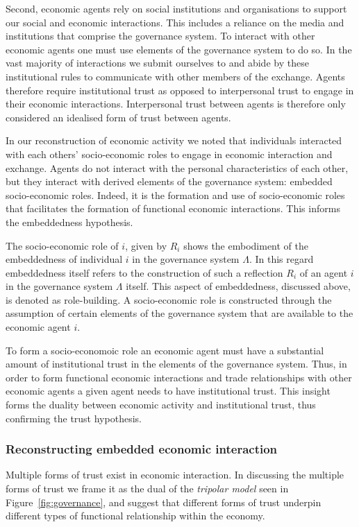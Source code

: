 \begin{subappendices}
Second, economic agents rely on social institutions and organisations to support our social and economic interactions. This includes a reliance on the media and institutions that comprise the governance system. To interact with other economic agents one must use elements of the governance system to do so. In the vast majority of interactions we submit ourselves to and abide by these institutional rules to communicate with other members of the exchange. Agents therefore require institutional trust as opposed to interpersonal trust to engage in their economic interactions. Interpersonal trust between agents is therefore only considered an idealised form of trust between agents.

\medskip\noindent In our reconstruction of economic activity we noted that individuals interacted with each others' socio-economic roles to engage in economic interaction and exchange. Agents do not interact with the personal characteristics of each other, but they interact with derived elements of the governance system: embedded socio-economic roles. Indeed, it is the formation and use of socio-economic roles that facilitates the formation of functional economic interactions. This informs the embeddedness hypothesis.

The socio-economic role of $i$, given by $R_{i}$ shows the embodiment of the embeddedness of individual $i$ in the governance system $\Lambda$. In this regard embeddedness itself refers to the construction of such a reflection $R_{i}$ of an agent $i$ in the governance system $\Lambda$ itself. This aspect of embeddedness, discussed above, is denoted as role-building. A socio-economic role is constructed through the assumption of certain elements of the governance system that are available to the economic agent $i$.

To form a socio-economoic role an economic agent must have a substantial amount of institutional trust in the elements of the governance system. Thus, in order to form functional economic interactions and trade relationships with other economic agents a given agent needs to have institutional trust. This insight forms the duality between economic activity and institutional trust, thus confirming the trust hypothesis.

\subsubsection{Reconstructing embedded economic interaction}

Multiple forms of trust exist in economic interaction. In discussing the multiple forms of trust we frame it as the dual of the \textit{tripolar model} seen in Figure~\ref{fig:governance}, and suggest that different forms of trust underpin different types of functional relationship within the economy.


\end{subappendices}
